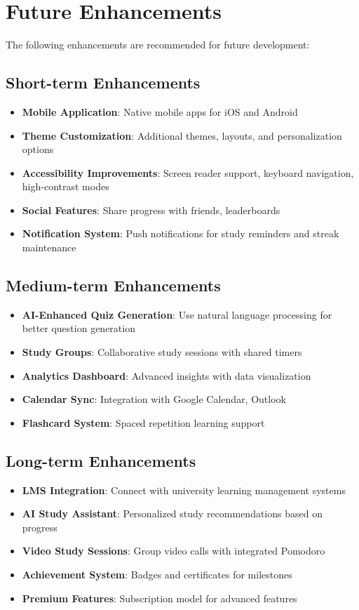 \section{Future Enhancements}
The following enhancements are recommended for future development:

\subsection{Short-term Enhancements}
\begin{itemize}
    \item \textbf{Mobile Application}: Native mobile apps for iOS and Android
    \item \textbf{Theme Customization}: Additional themes, layouts, and personalization options
    \item \textbf{Accessibility Improvements}: Screen reader support, keyboard navigation, high-contrast modes
    \item \textbf{Social Features}: Share progress with friends, leaderboards
    \item \textbf{Notification System}: Push notifications for study reminders and streak maintenance
\end{itemize}

\subsection{Medium-term Enhancements}
\begin{itemize}
    \item \textbf{AI-Enhanced Quiz Generation}: Use natural language processing for better question generation
    \item \textbf{Study Groups}: Collaborative study sessions with shared timers
    \item \textbf{Analytics Dashboard}: Advanced insights with data visualization
    \item \textbf{Calendar Sync}: Integration with Google Calendar, Outlook
    \item \textbf{Flashcard System}: Spaced repetition learning support
\end{itemize}

\subsection{Long-term Enhancements}
\begin{itemize}
    \item \textbf{LMS Integration}: Connect with university learning management systems
    \item \textbf{AI Study Assistant}: Personalized study recommendations based on progress
    \item \textbf{Video Study Sessions}: Group video calls with integrated Pomodoro
    \item \textbf{Achievement System}: Badges and certificates for milestones
    \item \textbf{Premium Features}: Subscription model for advanced features
\end{itemize}

